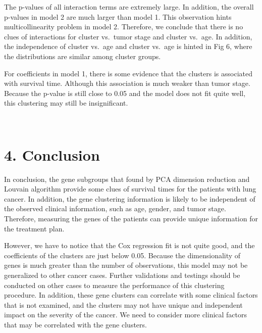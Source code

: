 \documentclass[11pt]{article}
\begin{document}
    
    The p-values of all interaction terms are extremely large. In addition,
the overall p-values in model 2 are much larger than model 1. This
observation hints multicollinearity problem in model 2. Therefore, we
conclude that there is no clues of interactions for cluster vs.~tumor
stage and cluster vs.~age. In addition, the independence of cluster
vs.~age and cluster vs.~age is hinted in Fig 6, where the distributions
are similar among cluster groups.

For coefficients in model 1, there is some evidence that the clusters is
associated with survival time. Although this association is much weaker
than tumor stage. Because the p-value is still close to 0.05 and the
model does not fit quite well, this clustering may still be
insignificant.


    \begin{center}
    \end{center}
    { \hspace*{\fill} \\}
    
    \hypertarget{conclusion}{%
\section{4. Conclusion}\label{conclusion}}

    In conclusion, the gene subgroups that found by PCA dimension reduction
and Louvain algorithm provide some clues of survival times for the
patients with lung cancer. In addition, the gene clustering information
is likely to be independent of the observed clinical information, such
as age, gender, and tumor stage. Therefore, measuring the genes of the
patients can provide unique information for the treatment plan.

However, we have to notice that the Cox regression fit is not quite
good, and the coefficients of the clusters are just below 0.05. Because
the dimensionality of genes is much greater than the number of
observations, this model may not be generalized to other cancer cases.
Further validations and testings should be conducted on other cases to
measure the performance of this clustering procedure. In addition, these
gene clusters can correlate with some clinical factors that is not
examined, and the clusters may not have unique and independent impact on
the severity of the cancer. We need to consider more clinical factors
that may be correlated with the gene clusters.

    



    
    
    
\end{document}
